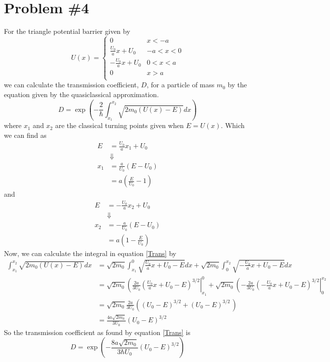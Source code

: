 \documentclass[11pt]{article}
\numberwithin{equation}{section}
\begin{document}
\section{Problem \#4}
For the triangle potential barrier given by
$$U(x) = \left\{\begin{array}{ll}
               0                    &x<-a\\
               \frac{U_0}{a}x+U_0   &-a<x<0\\
               -\frac{U_0}{a}x+U_0  &0<x<a\\
               0                    &x>a\\
         \end{array}\right.$$
we can calculate the transmission coefficient, $D$, for a particle of mass $m_0$ by the 
equation given by the quasiclassical approximation.
\begin{equation}
D = \exp\left(-\frac{2}{\hbar}\int_{x_1}^{x_2}\sqrt{2m_0(U(x)-E)}dx\right)
\label{Trans}
\end{equation}
where $x_1$ and $x_2$ are the classical turning points given when $E=U(x)$. Which we can
find as
\begin{align*}
E &= \frac{U_0}{a}x_1+U_0\\
&\Downarrow\\
x_1 &= \frac{a}{U_0}(E-U_0)\\
&= a\left(\frac{E}{U_0}-1\right)
\end{align*}
and
\begin{align*}
E &= -\frac{U_0}{a}x_2+U_0\\
&\Downarrow\\
x_2 &= -\frac{a}{U_0}(E-U_0)\\
&= a\left(1-\frac{E}{U_0}\right)
\end{align*}
Now, we can calculate the integral in equation \ref{Trans} by
\begin{align*}
\int_{x_1}^{x_2}\sqrt{2m_0(U(x)-E)}dx &= \sqrt{2m_0}\int_{x_1}^{0}\sqrt{\frac{U_0}{a}x+U_0-E}dx + \sqrt{2m_0}\int_{0}^{x_2}\sqrt{-\frac{U_0}{a}x+U_0-E}dx\\
&= \sqrt{2m_0}\left(\frac{2a}{3U_0}\left(\frac{U_0}{a}x+U_0-E\right)^{3/2}\right|_{x_1}^{0} + \sqrt{2m_0}\left(-\frac{2a}{3U_0}\left(-\frac{U_0}{a}x+U_0-E\right)^{3/2}\right|_{0}^{x_2}\\
&= \sqrt{2m_0}\frac{2a}{3U_0}\left((U_0-E)^{3/2} + (U_0-E)^{3/2}\frac{}{}\right)\\
&= \frac{4a\sqrt{2m_0}}{3U_0}(U_0-E)^{3/2}
\end{align*}
So the transmission coefficient as found by equation \ref{Trans} is
$$D = \exp\left(-\frac{8a\sqrt{2m_0}}{3\hbar{U_0}}(U_0-E)^{3/2}\right)$$
\end{document}

